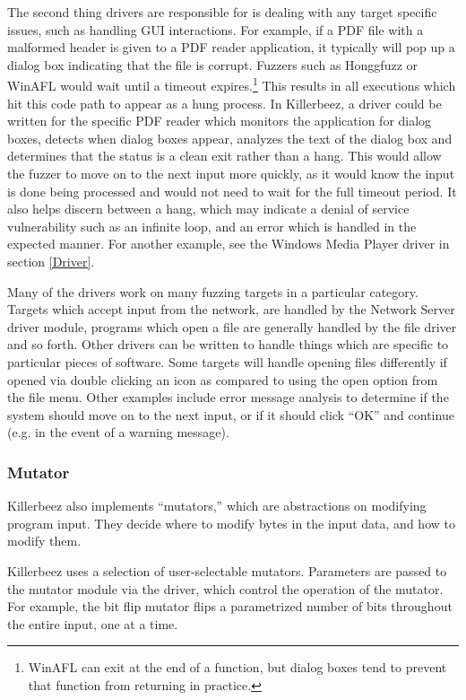 The second thing drivers are responsible for is dealing with any target
specific issues, such as handling GUI interactions.  For example, if a PDF file
with a malformed header is given to a PDF reader application, it typically will
pop up a dialog box indicating that the file is corrupt. Fuzzers such as
Honggfuzz or WinAFL\cite{winafl} would wait until a timeout expires.\footnote{WinAFL can
exit at the end of a function, but dialog boxes tend to prevent that function
from returning in practice.} This results in all executions which hit this code
path to appear as a hung process.  In Killerbeez, a driver could be written for
the specific PDF reader which monitors the application for dialog boxes,
detects when dialog boxes appear, analyzes the text of the dialog box and
determines that the status is a clean exit rather than a hang.  This would allow
the fuzzer to move on to the next input more quickly, as it would know the
input is done being processed and would not need to wait for the full timeout
period.  It also helps discern between a hang, which may indicate a denial of
service vulnerability such as an infinite loop, and an error which is handled
in the expected manner. For another example, see the Windows Media Player
driver in section \ref{Driver}.

Many of the drivers work on many fuzzing targets in a particular category.
Targets which accept input from the network, are handled by the Network Server
driver module, programs which open a file are generally handled by the file
driver and so forth.  Other drivers can be written to handle things which are
specific to particular pieces of software.  Some targets will handle opening files
differently if opened via double clicking an icon as compared to using the open
option from the file menu. Other examples include error message analysis to
determine if the system should move on to the next input, or if it should click
``OK'' and continue (e.g. in the event of a warning message).

\subsubsection{Mutator} \label{Mutator Overview}
Killerbeez also implements ``mutators,'' which are abstractions on modifying
program input. They decide where to modify bytes in the input data, and how
to modify them.

Killerbeez uses a selection of user-selectable mutators. Parameters are passed
to the mutator module via the driver, which control the operation of the
mutator. For example, the bit flip mutator flips a parametrized number of bits
throughout the entire input, one at a time.

